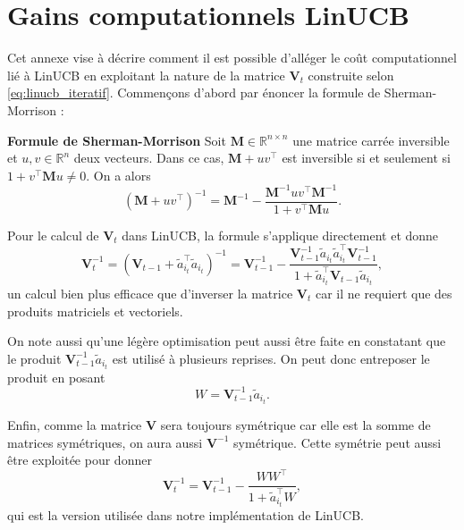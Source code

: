 \chapter{Gains computationnels LinUCB}     %
\label{chap:lincub_gains}                   %

Cet annexe vise à décrire comment il est possible d'alléger le coût computationnel
lié à LinUCB en exploitant la nature de la matrice $\mathbf{V}_t$ construite
selon \eqref{eq:linucb_iteratif}.
Commençons d'abord par énoncer la formule de Sherman-Morrison \citep{sherman1950adjustment}:

\textbf{Formule de Sherman-Morrison}
Soit $\mathbf{M} \in \mathbb{R}^{n \times n}$ une matrice carrée inversible et $u, v \in \mathbb{R}^n$
deux vecteurs.
Dans ce cas, $\mathbf{M} + uv^\top$ est inversible si et seulement si $1 + v^\top \mathbf{M}u \neq 0$.
On a alors
\begin{equation}
    \left(\mathbf{M} + uv^\top \right)^{-1} = \mathbf{M}^{-1} - \frac{\mathbf{M}^{-1}uv^\top\mathbf{M}^{-1}}{1 + v^\top \mathbf{M}u}.
    \label{eq:sherman_morrison}
\end{equation}

Pour le calcul de $\mathbf{V}_t$ dans LinUCB, la formule s'applique directement et
donne 
\begin{equation}
\mathbf{V}_t^{-1} =
\left(\mathbf{V}_{t-1} + \tilde{a}_{i_t}^\top \tilde{a}_{i_t} \right)^{-1} =
\mathbf{V}_{t-1}^{-1} - \frac{\mathbf{V}_{t-1}^{-1}\tilde{a}_{i_t}\tilde{a}_{i_t}^\top\mathbf{V}_{t-1}^{-1}}{1 + \tilde{a}_{i_t}^\top \mathbf{V}_{t-1}\tilde{a}_{i_t}},
\end{equation}
un calcul bien plus efficace que d'inverser la matrice $\mathbf{V}_t$ car il ne requiert 
que des produits matriciels et vectoriels.

On note aussi qu'une légère optimisation peut aussi être faite en constatant que 
le produit $\mathbf{V}^{-1}_{t-1}\tilde{a}_{i_t}$ est utilisé à plusieurs reprises.
On peut donc entreposer le produit en posant 
\begin{equation*}
W = \mathbf{V}^{-1}_{t-1}\tilde{a}_{i_t}.
\end{equation*}

Enfin, comme la matrice $\mathbf{V}$ sera toujours symétrique car elle est la 
somme de matrices symétriques, on aura aussi $\mathbf{V}^{-1}$ symétrique.
Cette symétrie peut aussi être exploitée pour donner 
\begin{equation}
    \mathbf{V}_t^{-1} =
    \mathbf{V}_{t-1}^{-1} - \frac{WW^\top}{1 + \tilde{a}_{i_t}^\top W},
\end{equation}
qui est la version utilisée dans notre implémentation de LinUCB.
